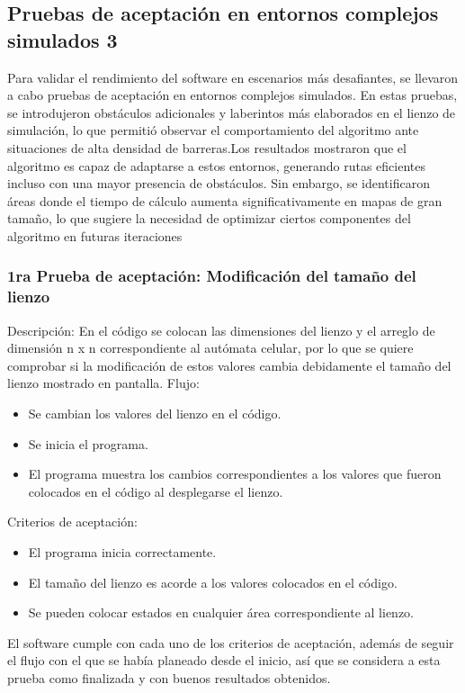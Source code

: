 \subsection{Pruebas de aceptaci\'on en entornos complejos simulados 3}
    Para validar el rendimiento del software en escenarios m\'as
        desafiantes, se llevaron a cabo pruebas de aceptaci\'on en
        entornos complejos simulados. En estas pruebas, se
        introdujeron obst\'aculos adicionales y laberintos m\'as
        elaborados en el lienzo de simulaci\'on, lo que permiti\'o
        observar el comportamiento del algoritmo ante situaciones
        de alta densidad de barreras.Los resultados mostraron que el algoritmo es capaz de
        adaptarse a estos entornos, generando rutas eficientes incluso
        con una mayor presencia de obst\'aculos. Sin embargo, se
        identificaron \'areas donde el tiempo de c\'alculo aumenta
        significativamente en mapas de gran tama\~no, lo que sugiere
        la necesidad de optimizar ciertos componentes del algoritmo
        en futuras iteraciones
    \vskip 0.5cm
    \subsubsection{1ra Prueba de aceptaci\'on: Modificaci\'on del tama\~no del lienzo}
        Descripci\'on: En el c\'odigo se colocan las dimensiones del
            lienzo y el arreglo de dimensi\'on n x n correspondiente al
            aut\'omata celular, por lo que se quiere comprobar si la
            modificaci\'on de estos valores cambia debidamente el
            tama\~no del lienzo mostrado en pantalla.
        \vskip 0.5cm
        Flujo:
        \begin{itemize}
            \item Se cambian los valores del lienzo en el c\'odigo.
            \item Se inicia el programa.
            \item El programa muestra los cambios correspondientes a los
            valores que fueron colocados en el c\'odigo al
            desplegarse el lienzo.
        \end{itemize}
        \vskip 0.5cm
        Criterios de aceptaci\'on:
        \begin{itemize}
            \item El programa inicia correctamente.
            \item El tama\~no del lienzo es acorde a los valores colocados
            en el c\'odigo.
            \item Se pueden colocar estados en cualquier \'area
            correspondiente al lienzo.
        \end{itemize}
        \vskip 0.5cm
        El software cumple con cada uno de los criterios de
            aceptaci\'on, adem\'as de seguir el flujo con el que se hab\'ia
            planeado desde el inicio, as\'i que se considera a esta prueba
            como finalizada y con buenos resultados obtenidos.
    \vskip 0.5cm
